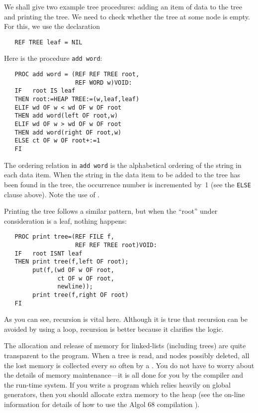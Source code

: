 We shall give two example tree procedures: adding an item of data to
the tree and printing the tree. We need to check whether the tree at
some node is empty. For this, we use the declaration
\begin{verbatim}
   REF TREE leaf = NIL
\end{verbatim}
\noindent
Here is the procedure \verb|add word|:
\begin{verbatim}
   PROC add word = (REF REF TREE root,
                    REF WORD w)VOID:
   IF   root IS leaf
   THEN root:=HEAP TREE:=(w,leaf,leaf)
   ELIF wd OF w < wd OF w OF root
   THEN add word(left OF root,w)
   ELIF wd OF w > wd OF w OF root
   THEN add word(right OF root,w)
   ELSE ct OF w OF root+:=1
   FI
\end{verbatim}
\noindent
The ordering relation in \verb|add word| is the alphabetical ordering
of the string in each data item. When the string in the data item to be
added to the tree has been found in the tree, the occurrence number is
incremented by~1 (see the \verb|ELSE| clause above).
Note the use of .

Printing the tree follows a similar pattern, but when the ``root'' under
consideration is a leaf, nothing happens:
\begin{verbatim}
   PROC print tree=(REF FILE f,
                    REF REF TREE root)VOID:
   IF   root ISNT leaf
   THEN print tree(f,left OF root);
        put(f,(wd OF w OF root,
               ct OF w OF root,
               newline));
        print tree(f,right OF root)
   FI
\end{verbatim}
\noindent
As you can see, recursion is vital here. Although it is true that
recursion can be avoided by using a loop, recursion is better because
it clarifies the logic.

The allocation and release of memory for linked-lists (including
trees) are quite transparent to the program.  When a tree is read,
and nodes possibly deleted, all the lost memory is collected every so
often by a .  You do not have to worry about
the details of memory main\-ten\-ance---it is all done for you by the
compiler and the run-time system.  If you write a program which
relies heavily on global generators, then you should allocate extra
memory to the heap (see the on-line information for details of how to
use the Algol 68 compilation ).

